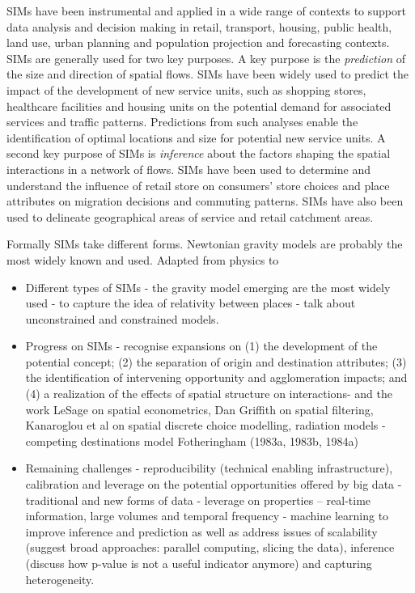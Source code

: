 \documentclass[11pt,letterpaper]{article}
\begin{document}
SIMs have been instrumental and applied in a wide range of contexts to support data analysis and decision making in retail, transport, housing, public health, land use, urban planning and population projection and forecasting contexts.
SIMs are generally used for two key purposes.
A key purpose is the \emph{prediction} of the size and direction of spatial flows.
SIMs have been widely used to predict the impact of the development of new service units, such as shopping stores, healthcare facilities and housing units on the potential demand for associated services and traffic patterns.
Predictions from such analyses enable the identification of optimal locations and size for potential new service units.
A second key purpose of SIMs is \emph{inference} about the factors shaping the spatial interactions in a network of flows.
SIMs have been used to determine and understand the influence of retail store on consumers' store choices and place attributes on migration decisions and commuting patterns.
SIMs have also been used to delineate geographical areas of service and retail catchment areas.

Formally SIMs take different forms.
Newtonian gravity models are probably the most widely known and used.
Adapted from physics to

\begin{itemize}
\item
  Different types of SIMs - the gravity model emerging are the most widely used - to capture the idea of relativity between places - talk about unconstrained and constrained models.
\item
  Progress on SIMs - recognise expansions on (1) the development of the potential concept; (2) the separation of origin and destination attributes; (3) the identification of intervening opportunity and agglomeration impacts; and (4) a realization of the effects of spatial structure on interactions- and the work LeSage on spatial econometrics, Dan Griffith on spatial filtering, Kanaroglou et al on spatial discrete choice modelling, radiation models - competing destinations model Fotheringham (1983a, 1983b, 1984a)
\item
  Remaining challenges - reproducibility (technical enabling infrastructure), calibration and leverage on the potential opportunities offered by big data - traditional and new forms of data - leverage on properties -- real-time information, large volumes and temporal frequency - machine learning to improve inference and prediction as well as address issues of scalability (suggest broad approaches: parallel computing, slicing the data), inference (discuss how p-value is not a useful indicator anymore) and capturing heterogeneity.
\end{itemize}
\end{document}
